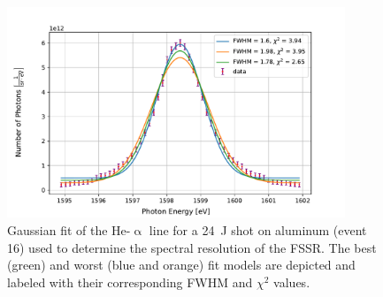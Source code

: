 \begin{figure}[H]
	\centering
	\includegraphics[width=0.9\textwidth]{Data_Analysis/resolution/peak_of_Al_(thick)_event_16_on_FSSR.pdf}
	\caption{Gaussian fit of the He-$\upalpha$ line for a \SI{24}{\joule} shot on aluminum (event 16) used to determine the spectral resolution of the FSSR. The best (green) and worst (blue and orange) fit models are depicted and labeled with their corresponding FWHM and $\chi^2$ values.}
	\label{fig: resolution FSSR}
\end{figure}

